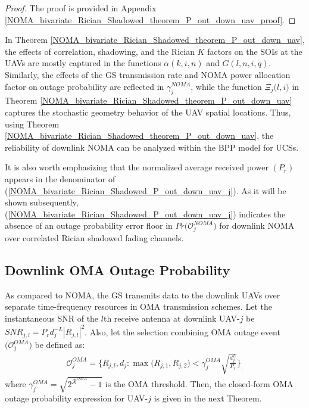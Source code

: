 \begin{proof}
The proof is provided in Appendix \ref{NOMA_bivariate_Rician_Shadowed_theorem_P_out_down_uav_proof}.
\end{proof}


In Theorem \ref{NOMA_bivariate_Rician_Shadowed_theorem_P_out_down_uav}, the effects of correlation, shadowing, and the Rician $K$ factors on the SOIs at the UAVs are mostly captured in the functions $\alpha(k,i,n)$ and $G(l,n,i,q)$. Similarly, the effects of the GS transmission rate and NOMA power allocation factor on outage probability are reflected in $\gamma_j^{NOMA}$, while the function $\Xi_j\big(l,i\big)$ in Theorem \ref{NOMA_bivariate_Rician_Shadowed_theorem_P_out_down_uav} captures the stochastic geometry behavior of the UAV spatial locations. Thus, using Theorem \ref{NOMA_bivariate_Rician_Shadowed_theorem_P_out_down_uav}, the reliability of downlink NOMA can be analyzed within the BPP model for UCSs. 

It is also worth emphasizing that the normalized average received power $(P_r)$ appears in the denominator of (\ref{NOMA_bivariate_Rician_Shadowed_P_out_down_uav_j}). As it will be shown subsequently, (\ref{NOMA_bivariate_Rician_Shadowed_P_out_down_uav_j}) indicates the absence of an outage probability error floor in $Pr\big(\mathcal{O}_{j}^{NOMA}\big)$ for downlink NOMA over correlated Rician shadowed fading channels.

\subsection{Downlink OMA Outage Probability}

As compared to NOMA, the GS transmits data to the downlink UAVs over separate time-frequency resources in OMA transmission schemes. Let the instantaneous SNR of the $l$th receive antenna at downlink UAV-$j$ be $SNR_{j,l} = P_r d_j^{-L} |R_{j,l}|^2$. Also, let the selection combining OMA outage event $\big(\mathcal{O}_{j}^{OMA}\big)$ be defined as:
\begin{eqnarray}
\mathcal{O}_{j}^{OMA} = \Bigg\{ R_{j,l}, d_{j} : \max\big(R_{j,1},R_{j,2}\big) < \gamma_j^{OMA} \sqrt{\frac{d_{j}^{L}}{P_r}}\Bigg\}_,
\end{eqnarray}
where $\gamma_j^{OMA} = \sqrt{2^{\mathcal{R}^{OMA}}-1}$ is the OMA threshold. Then, the closed-form OMA outage probability expression for UAV-$j$ is given in the next Theorem.

